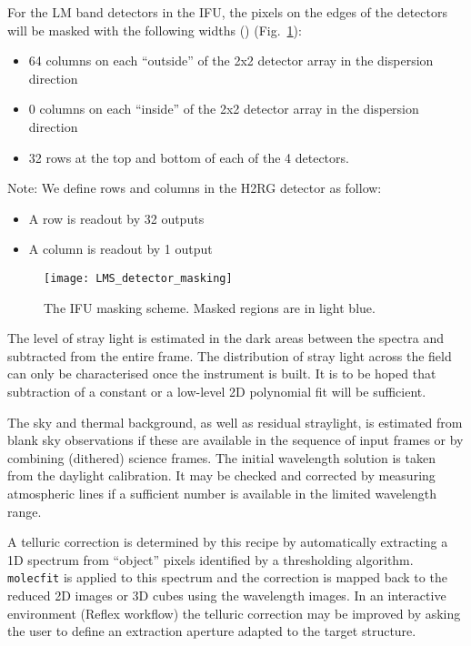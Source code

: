 For the LM band detectors in the IFU, the pixels on the edges of the detectors will be masked with the following widths \cite{matisse_minutes} () (Fig.~\ref{fig:ifu_detector_masking}):
\begin{itemize}
\item 64 columns on each ``outside'' of the 2x2 detector array in the dispersion direction
\item 0 columns on each ``inside'' of the 2x2 detector array in the dispersion direction
\item 32 rows at the top and bottom of each of the 4 detectors.
\end{itemize}
Note: We define rows and columns in the H2RG detector as follow:
\begin{itemize}
\item A row is readout by 32 outputs
\item A column is readout by 1 output
\end{itemize}

\begin{figure}[hb]
  \centering
  \texttt{[image: LMS\_detector\_masking]}
  \caption[Recipe: ]{%
    The IFU masking scheme. Masked regions are in light blue.}
  \label{fig:ifu_detector_masking}
\end{figure}



The level of stray light is estimated in the dark areas between the
spectra and subtracted from the entire frame. The distribution of
stray light across the field can only be characterised once the
instrument is built. It is to be hoped that subtraction of a constant
or a low-level 2D polynomial fit will be sufficient.

The sky and thermal background, as well as residual straylight, is
estimated from blank sky observations if these are available in the
sequence of input frames or by combining (dithered) science
frames. The initial wavelength solution is taken from the daylight
calibration. It may be checked and corrected by measuring atmospheric
lines if a sufficient number is available in the limited wavelength
range.

A telluric correction is determined by this recipe by automatically
extracting a 1D spectrum from ``object'' pixels identified by a
thresholding algorithm. \lstinline{molecfit} is applied to this
spectrum and the correction is mapped back to the reduced 2D images or
3D cubes using the wavelength images. In an interactive environment
(Reflex workflow) the telluric correction may be improved by asking
the user to define an extraction aperture adapted to the target
structure.

